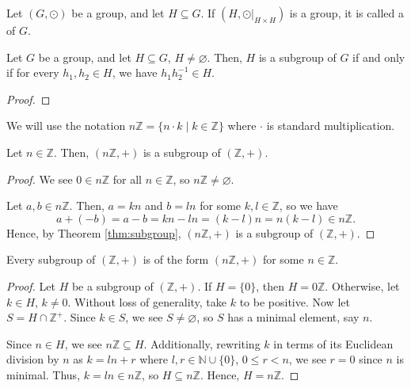 \begin{defn}
Let $ (G,\odot) $ be a group, and let $ H\subseteq G $. If $ (H,\odot\rvert_{H\times H}) $ is a group, it is called a  of $ G $.
\end{defn}

\begin{thm}\label{thm:subgroup}
Let $ G $ be a group, and let $ H\subseteq G $, $ H\neq\varnothing $. Then, $ H $ is a subgroup of $ G $ if and only if for every $ h_1,h_2\in H $, we have $ h_1h_2^{-1}\in H $.
\end{thm}
\begin{proof}
\end{proof}

We will use the notation $ n\mathbb{Z}=\{n\cdot k\mid k\in\mathbb{Z}\} $ where $ \cdot $ is standard multiplication.

\begin{prop}
Let $ n\in\mathbb{Z} $. Then, $ (n\mathbb{Z},+) $ is a subgroup of $ (\mathbb{Z},+) $.
\end{prop}
\begin{proof}
We see $ 0\in n\mathbb{Z} $ for all $ n\in\mathbb{Z} $, so $ n\mathbb{Z}\neq\varnothing $.

Let $ a,b\in n\mathbb{Z} $. Then, $ a=kn $ and $ b=ln $ for some $ k,l\in\mathbb{Z} $, so we have
\begin{equation*}
    a+(-b)=a-b=kn-ln=(k-l)n=n(k-l)\in n\mathbb{Z}.
\end{equation*}
Hence, by Theorem \ref{thm:subgroup}, $ (n\mathbb{Z},+) $ is a subgroup of $ (\mathbb{Z},+) $.
\end{proof}

\begin{prop}
Every subgroup of $ (\mathbb{Z},+) $ is of the form $ (n\mathbb{Z},+) $ for some $ n\in\mathbb{Z} $.
\end{prop}
\begin{proof}
Let $ H $ be a subgroup of $ (\mathbb{Z},+) $. If $ H=\{0\} $, then $ H=0\mathbb{Z} $. Otherwise, let $ k\in H $, $ k\neq 0 $. Without loss of generality, take $ k $ to be positive. Now let $ S=H\cap\mathbb{Z}^+ $. Since $ k\in S $, we see $ S\neq\varnothing $, so $ S $ has a minimal element, say $ n $.

Since $ n\in H $, we see $ n\mathbb{Z}\subseteq H $. Additionally, rewriting $ k $ in terms of its Euclidean division by $ n $ as $ k=ln+r $ where $ l,r\in\mathbb{N}\cup\{0\} $, $ 0\leq r<n $, we see $ r=0 $ since $ n $ is minimal. Thus, $ k=ln\in n\mathbb{Z} $, so $ H\subseteq n\mathbb{Z} $. Hence, $ H=n\mathbb{Z} $.
\end{proof}

